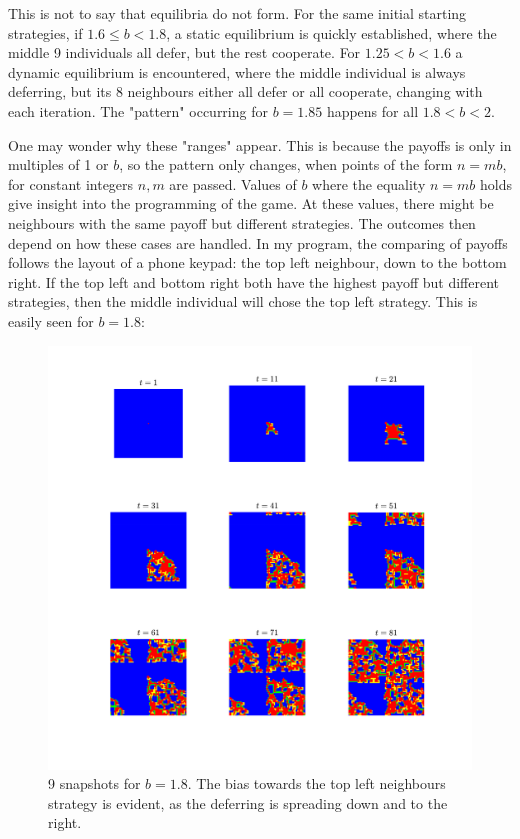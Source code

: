 \documentclass[a4paper,10pt]{article} 	%
\numberwithin{equation}{section}
\begin{document}
	This is not to say that equilibria do not form. For the same initial starting strategies, if $ 1.6 \leq b < 1.8 $, a static equilibrium is quickly established, where the middle 9 individuals all defer, but the rest cooperate. For $ 1.25 < b < 1.6 $ a dynamic equilibrium is encountered, where the middle individual is always deferring, but its 8 neighbours either all defer or all cooperate, changing with each iteration. The "pattern" occurring for $ b=1.85 $ happens for all $ 1.8<b<2 $.
	
	One may wonder why these "ranges" appear. This is because the payoffs is only in multiples of 1 or $ b $, so the pattern only changes, when points of the form $ n=mb $, for constant integers $ n,m $ are passed. Values of $ b $ where the equality $ n=mb $ holds give insight into the programming of the game. At these values, there might be neighbours with the same payoff but different strategies. The outcomes then depend on how these cases are handled. In my program, the comparing of payoffs follows the layout of a phone keypad: the top left neighbour, down to the bottom right. If the top left and bottom right both have the highest payoff but different strategies, then the middle individual will chose the top left strategy. This is easily seen for $ b=1.8 $:
	
	\begin{figure}[H]
		\centering
		\includegraphics[width=\linewidth]{prisonersnapshot2}
		\caption{9 snapshots for $ b=1.8 $. The bias towards the top left neighbours strategy is evident, as the deferring is spreading down and to the right.}
		\label{fig:snapshot2}
	\end{figure}
\end{document}
